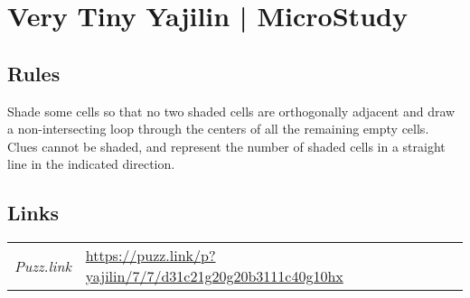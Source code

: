 \section[Very Tiny Yajilin | MicroStudy {[\emph{Yajilin}]}]{Very Tiny Yajilin | {\normalfont MicroStudy}}
\label{sec:53-very-tiny-yajilin-microstudy}

\subsection*{Rules}
\begin{markdown}
Shade some cells so that no two shaded cells are orthogonally adjacent and draw a non-intersecting loop through the centers of all the remaining empty cells. Clues cannot be shaded, and represent the number of shaded cells in a straight line in the indicated direction.
\end{markdown}
\subsection*{Links}
\begin{tabularx}{\textwidth}{l X}
\emph{Puzz.link} & \url{https://puzz.link/p?yajilin/7/7/d31c21g20g20b3111c40g10hx} \\
\end{tabularx}
\pagebreak
